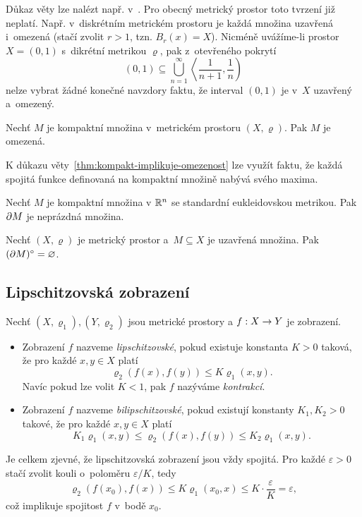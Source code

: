 Důkaz věty lze nalézt např. v~\citep[str. 166]{NetukaAnalyza2014}. Pro obecný metrický prostor toto tvrzení již neplatí. Např. v~diskrétním metrickém prostoru je každá množina uzavřená i~omezená (stačí zvolit $r>1$, tzn. $B_r(x)=X$). Nicméně uvážíme-li prostor $X=(0,1)$ s~dikrétní metrikou $\varrho$, pak z~otevřeného pokrytí
\[(0,1)\subseteq\bigcup_{n=1}^\infty\left\langle\dfrac{1}{n+1},\dfrac{1}{n}\right)\]
nelze vybrat žádné konečné navzdory faktu, že interval $(0,1)$ je v~$X$ uzavřený a~omezený.
\begin{theorem}\label{thm:kompakt-implikuje-omezenost}
    Nechť $M$ je kompaktní množina v~metrickém prostoru $(X,\varrho)$. Pak $M$ je omezená.
\end{theorem}
K důkazu věty~\ref{thm:kompakt-implikuje-omezenost} lze využít faktu, že každá spojitá funkce definovaná na kompaktní množině nabývá svého maxima.
\begin{theorem}\label{thm:neprazdna-hranice-kompaktu}
    Nechť $M$ je kompaktní množina v $\mathbb{R}^n$ se standardní eukleidovskou metrikou. Pak $\partial M$ je neprázdná množina.
\end{theorem}
\begin{theorem}\label{thm:vnitrek-hranice-uz-mnoziny}
    Nechť $(X,\varrho)$ je metrický prostor a~$M\subseteq X$ je uzavřená množina. Pak $(\partial M)^\circ=\varnothing$.
\end{theorem}

\subsection{Lipschitzovská zobrazení}\label{subsec:lipschitzovska-zobrazeni}

\begin{definition}\label{def:bilipschitzovske-zobrazeni}
    Nechť $(X,\varrho_1),(Y,\varrho_2)$ jsou metrické prostory a $f:X \rightarrow Y$ je zobrazení.
    \begin{itemize}
        \item Zobrazení $f$ nazveme \emph{lipschitzovské}, pokud existuje konstanta $K>0$ taková, že pro každé $x,y\in X$ platí
        \[\varrho_2(f(x),f(y))\leqslant K\varrho_1(x,y).\]
        Navíc pokud lze volit $K<1$, pak $f$ nazýváme \emph{kontrakcí}.
        \item Zobrazení $f$ nazveme \emph{bilipschitzovské}, pokud existují konstanty $K_1,K_2>0$ takové, že pro každé $x,y\in X$ platí
        \[K_1\varrho_1(x,y)\leqslant\varrho_2(f(x),f(y))\leqslant K_2\varrho_1(x,y).\]
    \end{itemize}
\end{definition}
Je celkem zjevné, že lipschitzovská zobrazení jsou vždy spojitá. Pro každé $\varepsilon>0$ stačí zvolit kouli o~poloměru $\varepsilon/K$, tedy
\[\varrho_2(f(x_0),f(x))\leqslant K\varrho_1(x_0,x)\leqslant K\cdot\dfrac{\varepsilon}{K}=\varepsilon,\]
což implikuje spojitost $f$ v~bodě $x_0$.